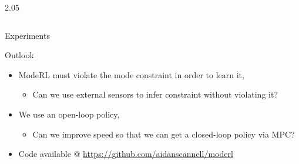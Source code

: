 \documentclass[final,11pt]{beamer}
\newlength{\colwidth}
\begin{document}
\begin{frame}[t]
\begin{columns}[t]
\begin{column}{2.05\colwidth}
\begin{columns}[t]
\begin{column}{\colwidth}
\begin{block}{Experiments}
  \end{block}

  \begin{block}{Outlook}


  \begin{itemize}
    \item \alert{ModeRL} must violate the mode constraint in order to learn it,
    \begin{itemize}
      \item Can we use external sensors to infer constraint without violating it?
    \end{itemize}
    \item We use an open-loop policy,
    \begin{itemize}
      \item Can we improve speed so that we can get a closed-loop policy via MPC?
    \end{itemize}
    \item Code available @ \url{https://github.com/aidanscannell/moderl}
  \end{itemize}

  \end{block}

  \vspace*{1em}



\end{column}
\end{columns}
\end{column}
\end{columns}
\end{frame}
\end{document}
